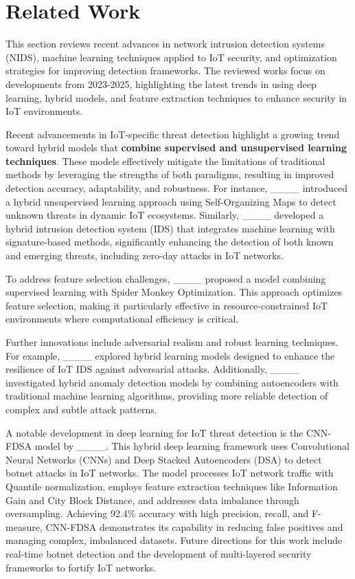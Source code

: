 \section{Related Work}
This section reviews recent advances in network intrusion detection systems (NIDS), machine learning techniques applied to IoT security, and optimization strategies for improving detection frameworks. The reviewed works focus on developments from 2023-2025, highlighting the latest trends in using deep learning, hybrid models, and feature extraction techniques to enhance security in IoT environments.

Recent advancements in IoT-specific threat detection highlight a growing trend toward hybrid models that \textbf{combine supervised and unsupervised learning techniques}. These models effectively mitigate the limitations of traditional methods by leveraging the strengths of both paradigms, resulting in improved detection accuracy, adaptability, and robustness. For instance, ____ introduced a hybrid unsupervised learning approach using Self-Organizing Maps to detect unknown threats in dynamic IoT ecosystems. Similarly, ____ developed a hybrid intrusion detection system (IDS) that integrates machine learning with signature-based methods, significantly enhancing the detection of both known and emerging threats, including zero-day attacks in IoT networks.

To address feature selection challenges, ____ proposed a model combining supervised learning with Spider Monkey Optimization. This approach optimizes feature selection, making it particularly effective in resource-constrained IoT environments where computational efficiency is critical.

Further innovations include adversarial realism and robust learning techniques. For example, ____ explored hybrid learning models designed to enhance the resilience of IoT IDS against adversarial attacks. Additionally, ____ investigated hybrid anomaly detection models by combining autoencoders with traditional machine learning algorithms, providing more reliable detection of complex and subtle attack patterns.

A notable development in deep learning for IoT threat detection is the CNN-FDSA model by ____. This hybrid deep learning framework uses Convolutional Neural Networks (CNNs) and Deep Stacked Autoencoders (DSA) to detect botnet attacks in IoT networks. The model processes IoT network traffic with Quantile normalization, employs feature extraction techniques like Information Gain and City Block Distance, and addresses data imbalance through oversampling. Achieving 92.4\% accuracy with high precision, recall, and F-measure, CNN-FDSA demonstrates its capability in reducing false positives and managing complex, imbalanced datasets. Future directions for this work include real-time botnet detection and the development of multi-layered security frameworks to fortify IoT networks.

